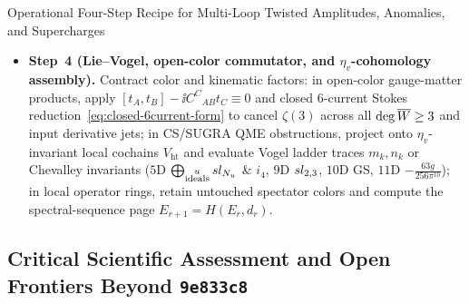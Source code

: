 \begin{summaryblock}{Operational Four-Step Recipe for Multi-Loop Twisted Amplitudes, Anomalies, and Supercharges}
\begin{itemize}[leftmargin=*]
  \item \textbf{Step~4 (Lie--Vogel, open-color commutator, and $\eta_v$-cohomology assembly).} Contract color and kinematic factors: in open-color gauge-matter products, apply $[t_A,t_B] - \ii C^C{}_{AB}t_C \equiv 0$ and closed $6$-current Stokes reduction~\eqref{eq:closed-6current-form} to cancel $\zeta(3)$ across all $\deg\overline{W} \ge 3$ and input derivative jets; in CS/SUGRA QME obstructions, project onto $\eta_v$-invariant local cochains $V_{\mathrm{ht}}$ and evaluate Vogel ladder traces $m_k,n_k$ or Chevalley invariants ($5\mathrm{D}$ $\bigoplus_{\substack{u\\\mathrm{ideals}}}sl_{N_u}$ \& $i_4$, $9\mathrm{D}$ $sl_{2,3}$, $10\mathrm{D}$ GS, $11\mathrm{D}$ $-\frac{63g}{256\pi^{10}}$); in local operator rings, retain untouched spectator colors and compute the spectral-sequence page $E_{r+1} = H(E_r, d_r)$.
\end{itemize}
\end{summaryblock}

\subsection{Critical Scientific Assessment and Open Frontiers Beyond \texttt{9e833c8}}
\label{subsec:open-frontiers}

